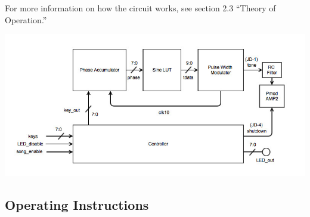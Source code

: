 \documentclass{article}
\begin{document}
    For more information on how the circuit works, see section 2.3 ``Theory of Operation.''

    \vspace{-.1em}
    \includegraphics[width=5.5in]{img/basicblock.jpg}

  \doublespacing
  \subsection{Operating Instructions}

\end{document}
